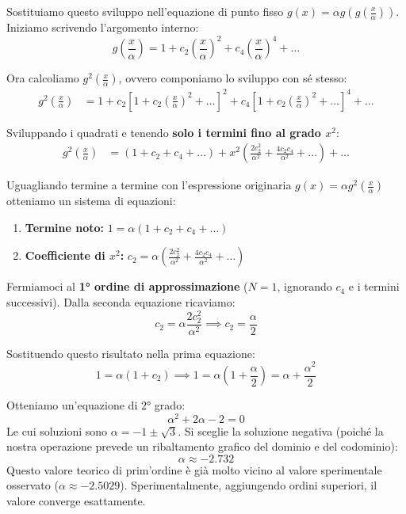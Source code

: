 \documentclass[openany]{book}
\theoremstyle{definition}
\theoremstyle{remark}
\begin{document}
Sostituiamo questo sviluppo nell'equazione di punto fisso $g(x) = \alpha g\left(g\left(\frac{x}{\alpha}\right)\right)$. Iniziamo scrivendo l'argomento interno:
\begin{equation}
    g\left(\frac{x}{\alpha}\right) = 1 + c_2\left(\frac{x}{\alpha}\right)^2 + c_4\left(\frac{x}{\alpha}\right)^4 + \dots
\end{equation}

Ora calcoliamo $g^2\left(\frac{x}{\alpha}\right)$, ovvero componiamo lo sviluppo con sé stesso:
\begin{align*}
    g^2\left(\frac{x}{\alpha}\right) &= 1 + c_2 \left[ 1 + c_2\left(\frac{x}{\alpha}\right)^2 + \dots \right]^2 + c_4 \left[ 1 + c_2\left(\frac{x}{\alpha}\right)^2 + \dots \right]^4 + \dots
\end{align*}

Sviluppando i quadrati e tenendo \textbf{solo i termini fino al grado $x^2$}:
\begin{align*}
    g^2\left(\frac{x}{\alpha}\right) &= (1 + c_2 + c_4 + \dots) + x^2 \left( \frac{2c_2^2}{\alpha^2} + \frac{4c_2 c_4}{\alpha^2} + \dots \right) + \dots
\end{align*}

Uguagliando termine a termine con l'espressione originaria $g(x) = \alpha g^2\left(\frac{x}{\alpha}\right)$ otteniamo un sistema di equazioni:
\begin{enumerate}
    \item \textbf{Termine noto:} $1 = \alpha (1 + c_2 + c_4 + \dots)$
    \item \textbf{Coefficiente di $x^2$:} $c_2 = \alpha \left( \frac{2c_2^2}{\alpha^2} + \frac{4c_2 c_4}{\alpha^2} + \dots \right)$
\end{enumerate}

Fermiamoci al \textbf{1° ordine di approssimazione} ($N=1$, ignorando $c_4$ e i termini successivi). Dalla seconda equazione ricaviamo:
\begin{equation*}
    c_2 = \alpha \frac{2c_2^2}{\alpha^2} \implies c_2 = \frac{\alpha}{2}
\end{equation*}

Sostituendo questo risultato nella prima equazione:
\begin{equation*}
    1 = \alpha(1 + c_2) \implies 1 = \alpha\left(1 + \frac{\alpha}{2}\right) = \alpha + \frac{\alpha^2}{2}
\end{equation*}

Otteniamo un'equazione di 2° grado:
\begin{equation}
    \alpha^2 + 2\alpha - 2 = 0
\end{equation}
Le cui soluzioni sono $\alpha = -1 \pm \sqrt{3}$. Si sceglie la soluzione negativa (poiché la nostra operazione prevede un ribaltamento grafico del dominio e del codominio):
\begin{equation}
    \alpha \approx -2.732
\end{equation}
Questo valore teorico di prim'ordine è già molto vicino al valore sperimentale osservato ($\alpha \approx -2.5029$). Sperimentalmente, aggiungendo ordini superiori, il valore converge esattamente.
\end{document}
